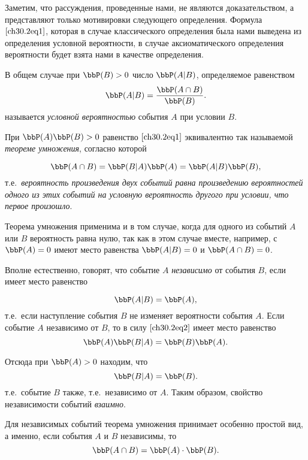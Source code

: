 Заметим, что рассуждения, проведенные нами, не являются доказательством, а представляют только мотивировки следующего определения.
Формула~$\eqref{ch30.2eq1}$, которая в случае классического определения была нами выведена из определения условной вероятности, в случае аксиоматического определения вероятности будет взята нами в качестве определения. 
\begin{defn} В общем случае при $\bbP(B) > 0$ число $\bbP (A|B)$, определяемое равенством
$$
\bbP(A|B) = \frac{\bbP(A\cap B)}{\bbP(B)}.
$$
называется \textit{условной вероятностью} события $A$ при условии $B$.
\end{defn}

При $\bbP(A)\bbP(B) > 0$ равенство $\eqref{ch30.2eq1}$ эквивалентно так называемой \textit{теореме умножения}, согласно которой

\begin{equation} \label{ch30.2eq2}
\bbP(A\cap B) = \bbP(B|A)\bbP(A) = \bbP(A|B)\bbP(B),
\end{equation}
т.е.~\textit{вероятность произведения двух событий равна произведению вероятностей одного из этих событий на условную вероятность другого при условии, что первое произошло}.

Теорема умножения применима и в том случае, когда для одного из событий $A$ или $B$ вероятность равна нулю, так как в этом случае вместе, например, с $\bbP(A) = 0$ имеют место равенства $\bbP(A|B) = 0$ и $\bbP(A\cap B) = 0$.

Вполне естественно, говорят, что событие $A$ \textit{независимо} от события $B$, если имеет место равенство

\begin{equation} \label{ch30.2eq3}
\bbP(A|B) = \bbP(A),
\end{equation}
т.е.~если наступление события $B$ не изменяет вероятности события $A$. Если событие $A$ независимо от $B$, то в силу $\eqref{ch30.2eq2}$ имеет место равенство
$$
\bbP(A)\bbP(B|A) = \bbP(B)\bbP(A).
$$

Отсюда при $\bbP(A) > 0$ находим, что
\begin{equation} \label{ch30.2eq4}
\bbP(B|A) = \bbP(B).
\end{equation}
т.е.~событие $B$ также, т.е.~независимо от $A$. Таким образом, свойство независимости событий \textit{взаимно}.

Для независимых событий теорема умножения принимает особенно простой вид, а именно, если события $A$ и $B$ независимы, то
$$
\bbP(A\cap B) = \bbP(A) \cdot \bbP(B).
$$

